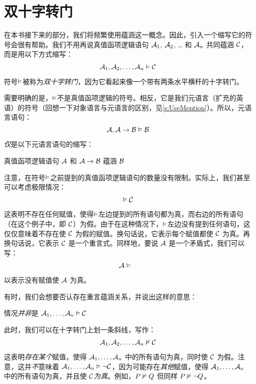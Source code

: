 
\section{双十字转门}
在本书接下来的部分，我们将频繁使用蕴涵这一概念。因此，引入一个缩写它的符号会很有帮助。我们不用再说真值函项逻辑语句 $\mathcal{A}_1$, $\mathcal{A}_2$, \dots{} 和 $\mathcal{A}_n$ 共同蕴涵 $\mathcal{C}$，而是用以下方式缩写：
	$$\mathcal{A}_1, \mathcal{A}_2, \dots, \mathcal{A}_n \vDash \mathcal{C}$$
符号$\vDash$被称为\emph{双十字转门}，因为它看起来像一个带有两条水平横杆的十字转门。

需要明确的是，$\vDash$不是真值函项逻辑的符号。相反，它是我们元语言（扩充的英语）的符号（回想一下对象语言与元语言的区别，见\cref{s:UseMention}）。所以，元语言语句：
	\[\mathcal{A}, \mathcal{A} \rightarrow \mathcal{B} \vDash \mathcal{B}\]
\emph{仅}是以下元语言语句的缩写：

\begin{center}
		真值函项逻辑语句 $\mathcal{A}$ 和 $\mathcal{A} \rightarrow \mathcal{B}$ 蕴涵 $\mathcal{B}$
	\end{center}


注意，在符号$\vDash$之前提到的真值函项逻辑语句的数量没有限制。实际上，我们甚至可以考虑极限情况：
	$$\vDash \mathcal{C}$$
这表明不存在任何赋值，使得$\vDash$左边提到的所有语句都为真，而右边的所有语句（在这个例子中，即 $\mathcal{C}$）为假。由于在这种情况下，$\vDash$左边没有提到任何语句，这仅仅意味着不存在使 $\mathcal{C}$ 为假的赋值。换句话说，它表示每个赋值都使 $\mathcal{C}$ 为真。再换句话说，它表示 $\mathcal{C}$ 是一个重言式。同样地，要说 $\mathcal{A}$ 是一个矛盾式，我们可以写：
	$$\metav{A} \entails\phantom{\metav{C}}$$
以表示没有赋值使 $\mathcal{A}$ 为真。

有时，我们会想要否认存在重言蕴涵关系，并说出这样的意思：


\begin{center}
	情况\emph{并非}是 $\mathcal{A}_1, \ldots, \mathcal{A}_n \vDash \mathcal{C}$
\end{center}


此时，我们可以在十字转门上划一条斜线，写作：
$$\mathcal{A}_1, \mathcal{A}_2, \ldots, \mathcal{A}_n \nvDash\mathcal{C}$$
这表明\emph{存在某个}赋值，使得 $\mathcal{A}_1,
\ldots, \mathcal{A}_n$ 中的所有语句为真，同时使 $\mathcal{C}$ 为假。注意，这并\emph{不}意味着 $\mathcal{A}_1,\ldots, \mathcal{A}_n
\vDash \neg \mathcal{C}$，因为可能存在\emph{其他}赋值，使得 $\mathcal{A}_1, \ldots, \mathcal{A}_n$ 中的所有语句为真，并且使 $\mathcal{C}$\emph{为真}。例如，$P \nvDash Q$ 但同样 $P \nvDash \neg Q$。

